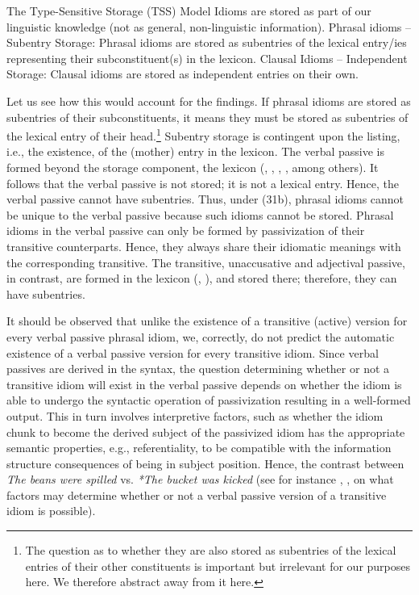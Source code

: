 \documentclass[output=paper,
modfonts
]{LSP/langsci}
\begin{document}
\ea The Type-Sensitive Storage (TSS) Model
	\ea Idioms are stored as part of our linguistic knowledge (not as
	general, non-linguistic information).
	\ex Phrasal idioms -- Subentry Storage: Phrasal idioms are stored as	
	subentries of the lexical entry/ies representing their subconstituent(s)
	in the lexicon.
	\ex Clausal Idioms -- Independent Storage: Clausal idioms are stored as
	independent entries on their own.
	\z
\z

Let us see how this would account for the findings. If phrasal idioms
are stored as subentries of their subconstituents, it means they must be
stored as subentries of the lexical entry of their head.\footnote{The
  question as to whether they are also stored as subentries of the
  lexical entries of their other constituents is important but
  irrelevant for our purposes here. We therefore abstract away from it
  here.} Subentry storage is contingent upon the listing, i.e., the
existence, of the (mother) entry in the lexicon. The verbal passive is
formed beyond the storage component, the lexicon (\citealt{baker1989}, \citealt{collins2005}, \citealt{horvath2008}, \citealt{meltzer2012}, among
others). It follows that the verbal passive is not stored; it is not a
lexical entry. Hence, the verbal passive cannot have subentries. Thus,
under (31b), phrasal idioms cannot be unique to the verbal passive
because such idioms cannot be stored. Phrasal idioms in the verbal
passive can only be formed by passivization of their transitive
counterparts. Hence, they always share their idiomatic meanings with the
corresponding transitive. The transitive, unaccusative and adjectival
passive, in contrast, are formed in the lexicon (\citealt{horvath2008,horvath2011}, \citealt{reinhart2002}), and stored there; therefore, they can have
subentries.

It should be observed that unlike the existence of a transitive (active)
version for every verbal passive phrasal idiom, we, correctly, do not
predict the automatic existence of a verbal passive version for every
transitive idiom. Since verbal passives are derived in the syntax, the
question determining whether or not a transitive idiom will exist in the
verbal passive depends on whether the idiom is able to undergo the
syntactic operation of passivization resulting in a well-formed output.
This in turn involves interpretive factors, such as whether the idiom
chunk to become the derived subject of the passivized idiom has the
appropriate semantic properties, e.g., referentiality, to be compatible
with the information structure consequences of being in subject
position. Hence, the contrast between \emph{The beans were spilled}
vs. \emph{*The bucket was kicked} (see for instance \citealt{nunberg1994}, \citealt{ruwet1991}, \citealt{punske2014} on what factors may
determine whether or not a verbal passive version of a transitive idiom
is possible).
\end{document}
